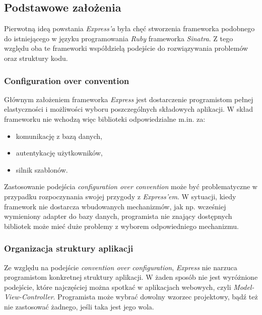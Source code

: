 \documentclass[mgr,oneside]{mgr}
\begin{document}
\subsection{Podstawowe założenia}
Pierwotną ideą powstania \textit{Express'a} była chęć stworzenia frameworka podobnego do istniejącego w języku programowania \textit{Ruby} frameworka \textit{Sinatra}. Z tego względu oba te frameworki współdzielą podejście do rozwiązywania problemów oraz struktury kodu.

\subsubsection{Configuration over convention}
Głównym założeniem frameworka \textit{Express} jest dostarczenie programistom pełnej elastyczności i możliwości wyboru poszczególnych składowych aplikacji. W skład frameworku nie wchodzą więc biblioteki odpowiedzialne m.in. za:
\begin{itemize}
  \item komunikację z bazą danych,
  \item autentykację użytkowników,
  \item silnik szablonów.
\end{itemize}

Zastosowanie podejścia \textit{configuration over convention} może być problematyczne w przypadku rozpoczynania swojej przygody z \textit{Express'em}. W sytuacji, kiedy framework nie dostarcza wbudowanych mechanizmów, jak np. wcześniej wymieniony adapter do bazy danych, programista nie znający dostępnych bibliotek może mieć duże problemy z wyborem odpowiedniego mechanizmu.

\subsubsection{Organizacja struktury aplikacji}
Ze względu na podejście \textit{convention over configuration}, \textit{Express} nie narzuca programistom konkretnej struktury aplikacji. W żaden sposób nie jest wyróżnione podejście, które najczęściej można spotkać w aplikacjach webowych, czyli \textit{Model-View-Controller}. Programista może wybrać dowolny wzorzec projektowy, bądź też nie zastosować żadnego, jeśli taka jest jego wola.
\end{document}
